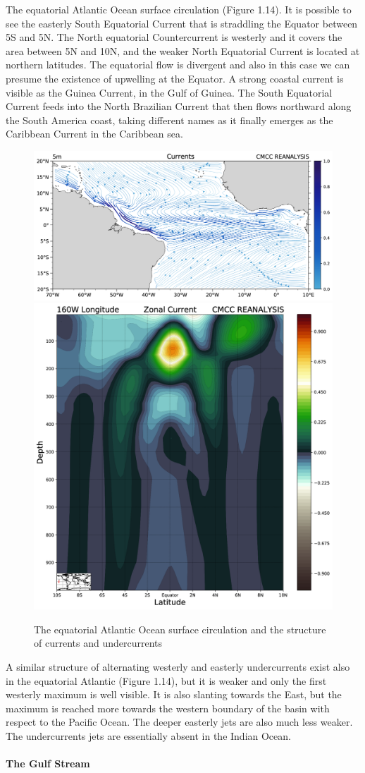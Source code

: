 The equatorial Atlantic Ocean surface circulation (Figure 1.14). It is possible to see the easterly South Equatorial
Current that is straddling the Equator between 5S and 5N. The North
equatorial Countercurrent is westerly and it covers the area between 5N
and 10N, and the weaker North Equatorial Current is located at northern
latitudes. The equatorial flow is divergent and also in this case we can
presume the existence of upwelling at the Equator. A strong coastal
current is visible as the Guinea Current, in the Gulf of Guinea. The
South Equatorial Current feeds into the North Brazilian Current that
then flows northward along the South America coast, taking different
names as it finally emerges as the Caribbean Current in the Caribbean
sea.
\begin{figure}[htpb!]
    \centering
    \includegraphics[width=0.45\linewidth]{uploads/41image.png}\quad \includegraphics[width=0.3\linewidth]{uploads/42.png}
    \caption{The equatorial Atlantic Ocean surface circulation and the structure of currents and undercurrents}
    \label{fig:fig17}
\end{figure}
A similar structure of alternating westerly and easterly undercurrents
exist also in the equatorial Atlantic (Figure 1.14), but it
is weaker and only the first westerly maximum is well visible. It is
also slanting towards the East, but the maximum is reached more towards
the western boundary of the basin with respect to the Pacific Ocean. The
deeper easterly jets are also much less weaker. The undercurrents jets
are essentially absent in the Indian Ocean.


\paragraph{The Gulf Stream}\label{the-gulf-stream}

